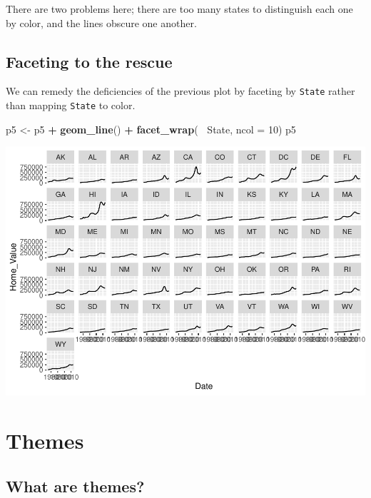 \documentclass[]{book}
\newenvironment{Shaded}{\begin{snugshade}}{\end{snugshade}}
\newcommand{\DataTypeTok}[1]{\textcolor[rgb]{0.13,0.29,0.53}{#1}}
\newcommand{\DecValTok}[1]{\textcolor[rgb]{0.00,0.00,0.81}{#1}}
\newcommand{\KeywordTok}[1]{\textcolor[rgb]{0.13,0.29,0.53}{\textbf{#1}}}
\newcommand{\NormalTok}[1]{#1}
\newcommand{\OperatorTok}[1]{\textcolor[rgb]{0.81,0.36,0.00}{\textbf{#1}}}
\newcommand{\StringTok}[1]{\textcolor[rgb]{0.31,0.60,0.02}{#1}}
\begin{document}
There are two problems here; there are too many states to distinguish each one by color, and the lines obscure one another.

\hypertarget{faceting-to-the-rescue}{%
\subsection{Faceting to the rescue}\label{faceting-to-the-rescue}}

We can remedy the deficiencies of the previous plot by faceting by \texttt{State} rather than mapping \texttt{State} to color.

\begin{Shaded}
\begin{Highlighting}[]
\NormalTok{p5 <-}\StringTok{ }\NormalTok{p5 }\OperatorTok{+}\StringTok{ }\KeywordTok{geom_line}\NormalTok{() }\OperatorTok{+}
\StringTok{   }\KeywordTok{facet_wrap}\NormalTok{(}\OperatorTok{~}\StringTok{ }\NormalTok{State, }\DataTypeTok{ncol =} \DecValTok{10}\NormalTok{)}
\NormalTok{p5}
\end{Highlighting}
\end{Shaded}

\includegraphics{R/Rgraphics/figures/unnamed-chunk-193-1.pdf}

\hypertarget{themes}{%
\section{Themes}\label{themes}}

\hypertarget{what-are-themes}{%
\subsection{What are themes?}\label{what-are-themes}}
\end{document}
